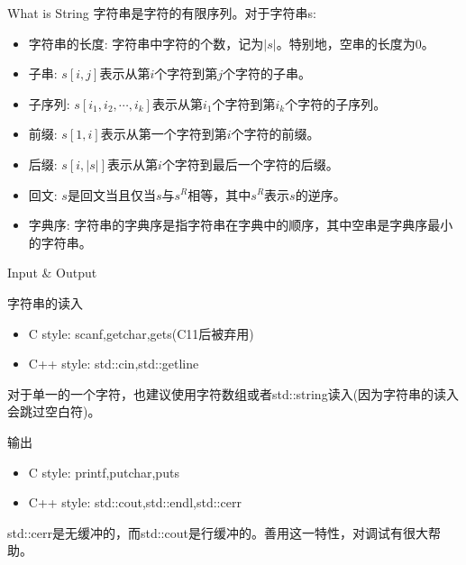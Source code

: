 \documentclass{ldr-simple-gray}
\begin{document}
  \begin{frame}{What is String}
    字符串是字符的有限序列。对于字符串s:
    \begin{itemize}
      \item 字符串的长度: 字符串中字符的个数，记为$|s|$。特别地，空串的长度为0。
      \item 子串: $s[i,j]$表示从第$i$个字符到第$j$个字符的子串。
      \item 子序列: $s[i_1,i_2,\cdots,i_k]$表示从第$i_1$个字符到第$i_k$个字符的子序列。
      \item 前缀: $s[1,i]$表示从第一个字符到第$i$个字符的前缀。
      \item 后缀: $s[i,|s|]$表示从第$i$个字符到最后一个字符的后缀。
      \item 回文: $s$是回文当且仅当$s$与$s^R$相等，其中$s^R$表示$s$的逆序。
      \item 字典序: 字符串的字典序是指字符串在字典中的顺序，其中空串是字典序最小的字符串。
    \end{itemize}
  \end{frame}

  \begin{frame}{Input \& Output}
    \begin{block}{字符串的读入}
      \begin{itemize}
        \item C style: scanf,getchar,gets(C11后被弃用)
        \item C++ style: std::cin,std::getline
      \end{itemize}
    \end{block}
    对于单一的一个字符，也建议使用字符数组或者std::string读入(因为字符串的读入会跳过空白符)。
    \begin{block}{输出}
      \begin{itemize}
        \item C style: printf,putchar,puts
        \item C++ style: std::cout,std::endl,std::cerr
      \end{itemize}
    \end{block}
    std::cerr是无缓冲的，而std::cout是行缓冲的。善用这一特性，对调试有很大帮助。
  \end{frame}
  
\end{document}
